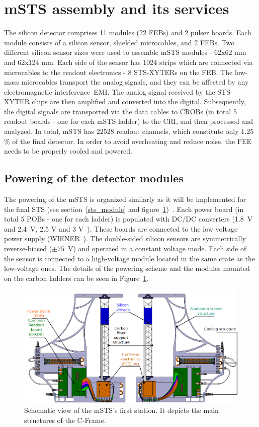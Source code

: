 \section{mSTS assembly and its services}

 The silicon detector comprises 11 modules (22 \glspl{FEB}) and 2 pulser boards. Each module consists of a silicon sensor, shielded microcables, and 2 \glspl{FEB}. Two different silicon sensor sizes were used to assemble \gls{mSTS} modules - 62x62 mm and 62x124 mm. Each side of the sensor has 1024 strips which are connected via microcables to the readout electronics - 8 STS-XYTERs on the \gls{FEB}. The low-mass microcables transport the analog signals, and they can be affected by any electromagnetic interference~\gls{EMI}. The analog signal received by the STS-XYTER chips are then amplified and converted into the digital. Subsequently, the digital signals are transported via the data cables to \glspl{CROB} (in total 5 readout boards - one for each \gls{mSTS} ladder) to the \gls{CRI}, and then processed and analyzed. In total, \gls{mSTS} has $22 528$ readout channels, which constitute only $1.25$\% of the final detector. In order to avoid overheating and reduce noise, the \gls{FEE} needs to be properly cooled and powered.  
\subsection{Powering of the detector modules}
\label{module}
The powering of the \gls{mSTS} is organized similarly as it will be implemented for the final \gls{STS} (see section~\ref{sts_module} and figure~\ref{fig_msts_scheme})~\cite{Koczon:2020Jc}. Each power board (in total 5 \glspl{POB} - one for each ladder) is populated with DC/DC converters (1.8~V and 2.4~V, 2.5 V and 3 V~\cite{DC_DC_converter}). These boards are connected to the low voltage power supply (WIENER~\cite{wiener}). The double-sided silicon sensors are symmetrically reverse-biased ($\pm 75$~V) and operated in a constant voltage mode. Each side of the sensor is connected to a high-voltage module located in the same crate as the low-voltage ones. The details of the powering scheme and the modules mounted on the carbon ladders can be seen in Figure~\ref{fig_msts_scheme}.

\begin{figure}[!h]
\centering
\includegraphics[width=0.9\columnwidth]{Chapter6/DCS/images/unit0.png}
\caption{Schematic view of the \gls{mSTS}'s first station. It depicts the main structures of the C-Frame. }
\label{fig_msts_scheme}
\end{figure}


